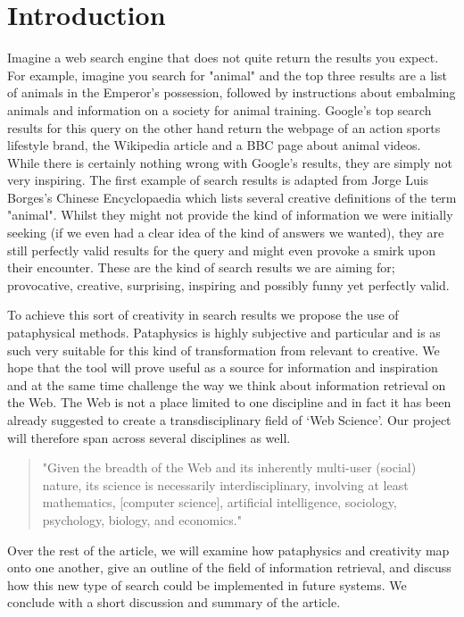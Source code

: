
\chapter{Introduction}
\label{ch:intro}

Imagine a web search engine that does not quite return the results you expect. For example, imagine you search for "animal" and the top three results are a list of animals in the Emperor's possession, followed by instructions about embalming animals and information on a society for animal training. Google's top search results for this query on the other hand return the webpage of an action sports lifestyle brand, the Wikipedia article and a BBC page about animal videos. While there is certainly nothing wrong with Google's results, they are simply not very inspiring. The first example of search results is adapted from Jorge Luis Borges's Chinese Encyclopaedia \citep{Borges2000} which lists several creative definitions of the term "animal". Whilst they might not provide the kind of information we were initially seeking (if we even had a clear idea of the kind of answers we wanted), they are still perfectly valid results for the query and might even provoke a smirk upon their encounter. These are the kind of search results we are aiming for; provocative, creative, surprising, inspiring and possibly funny yet perfectly valid.

To achieve this sort of creativity in search results we propose the use of pataphysical methods. Pataphysics is highly subjective and particular and is as such very suitable for this kind of transformation from relevant to creative. We hope that the tool will prove useful as a source for information and inspiration and at the same time challenge the way we think about information retrieval on the Web. The Web is not a place limited to one discipline and in fact it has been already suggested to create a transdisciplinary field of ‘Web Science'. Our project will therefore span across several disciplines as well.

\begin{quote}
  "Given the breadth of the Web and its inherently multi-user (social) nature, its science is necessarily interdisciplinary, involving at least mathematics, [computer science], artificial intelligence, sociology, psychology, biology, and economics." \citep{Hendler2008}
\end{quote}

Over the rest of the article, we will examine how pataphysics and creativity map onto one another, give an outline of the field of information retrieval, and discuss how this new type of search could be implemented in future systems. We conclude with a short discussion and summary of the article.

